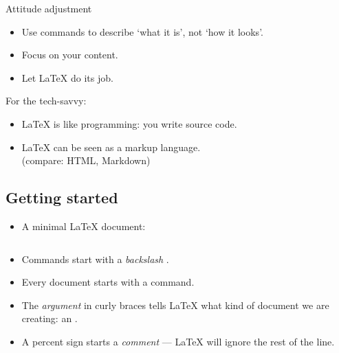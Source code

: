 \documentclass{beamer}
\begin{document}
\begin{frame}[fragile]{Attitude adjustment}

\begin{itemize}
\item Use commands to describe `what it is', not `how it looks'.
\item Focus on your content.
\item Let \LaTeX{} do its job.
\end{itemize}

\bigskip

For the tech-savvy:

\begin{itemize}
  \item \LaTeX{} is like programming: you write source code.
  \item \LaTeX{} can be seen as a markup language.\\(compare: HTML, Markdown)
\end{itemize}
\end{frame}

\subsection{Getting started}
\begin{frame}[fragile]{\insertsubsection}
\begin{itemize}
\item A minimal \LaTeX{} document:
\inputminted[frame=single]{latex}{basics.tex}
\item Commands start with a \emph{backslash} \keystrokebftt{\bs}.
\item Every document starts with a  command.
\item The \emph{argument} in curly braces \keystrokebftt{\{} \keystrokebftt{\}} tells \LaTeX{} what kind of document we are creating: an .
\item A percent sign \keystrokebftt{\%} starts a \emph{comment} --- \LaTeX{}
will ignore the rest of the line.
\end{itemize}
\end{frame}
\end{document}
